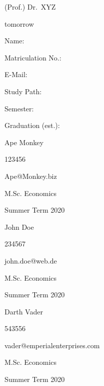 \documentclass[11pt,a4paper]{article}
\begin{document}
\begin{titlepage}
  \noindent\begin{minipage}[t]{0.3\textwidth}
  \end{minipage}
  \begin{minipage}[t]{0.7\textwidth}
  \hspace{1cm}(Prof.) Dr.~XYZ
  \end{minipage}

  \noindent\begin{minipage}[t]{0.3\textwidth}
  \end{minipage}
  \begin{minipage}[t]{0.7\textwidth}
  \hspace{1cm}tomorrow
  \end{minipage}

  \hrulefill

  \begin{multicols}{4}

  Name:

  Matriculation No.:

  E-Mail:

  Study Path:

  Semester:

  Graduation (est.):

  \columnbreak

  Ape Monkey

  123456

  Ape@Monkey.biz

  M.Sc. Economics


  Summer Term 2020

  \columnbreak

  John Doe

  234567

  john.doe@web.de

  M.Sc. Economics


  Summer Term 2020

  \columnbreak

  Darth Vader

  543556

  vader@emperialenterprises.com

  M.Sc. Economics


  Summer Term 2020

  \end{multicols}

\end{titlepage}
\end{document}
